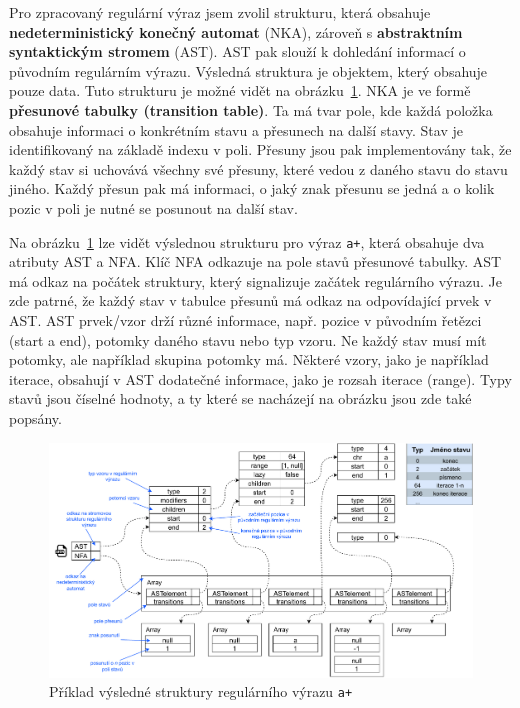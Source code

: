 Pro zpracovaný regulární výraz jsem zvolil strukturu, která obsahuje \textbf{nedeterministický konečný automat} (NKA), zároveň s \textbf{abstraktním syntaktickým stromem} (AST).
AST pak slouží k dohledání informací o původním regulárním výrazu. 
Výsledná struktura je objektem, který obsahuje pouze data.
Tuto strukturu je možné vidět na obrázku~\ref{fig:JSONex}.
NKA je ve formě \textbf{přesunové tabulky (transition table)}. 
Ta má tvar pole, kde každá položka obsahuje informaci o konkrétním stavu a přesunech na další stavy.
Stav je identifikovaný na základě indexu v poli. 
Přesuny jsou pak implementovány tak, že každý stav si uchovává všechny své přesuny, které vedou z daného stavu do stavu jiného.
Každý přesun pak má informaci, o jaký znak přesunu se jedná a o kolik pozic v poli je nutné se posunout na další stav. 

Na obrázku~\ref{fig:JSONex} lze vidět výslednou strukturu pro výraz \texttt{a+}, která obsahuje dva atributy AST a NFA.
Klíč NFA odkazuje na pole stavů přesunové tabulky. 
AST má odkaz na počátek struktury, který signalizuje začátek regulárního výrazu.
Je zde patrné, že každý stav v tabulce přesunů má odkaz na odpovídající prvek v AST. 
AST prvek/vzor drží různé informace, např. pozice v původním řetězci (start a end), 
potomky daného stavu nebo typ vzoru. 
Ne každý stav musí mít potomky, ale například skupina potomky má.
Některé vzory, jako je například iterace, obsahují v AST dodatečné informace, jako je rozsah iterace (range).
Typy stavů jsou číselné hodnoty, a ty které se nacházejí na obrázku jsou zde také popsány.

\begin{figure}[!h]
	\centering
	\includegraphics[width=1\textwidth]{Figures/BP-JSON.pdf}
	\caption{Příklad výsledné struktury regulárního výrazu \texttt{a+}}
	\label{fig:JSONex}
\end{figure}

